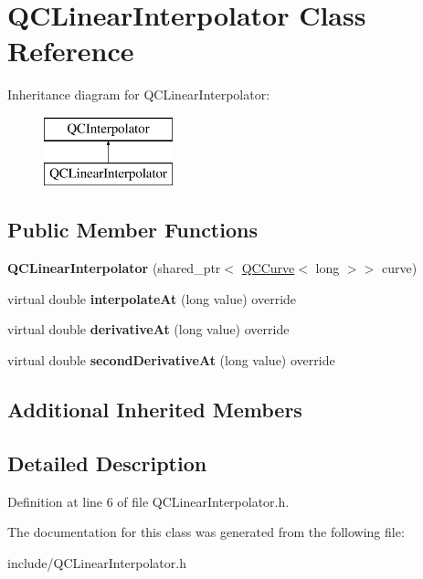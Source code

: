 \hypertarget{class_q_c_linear_interpolator}{\section{Q\+C\+Linear\+Interpolator Class Reference}
\label{class_q_c_linear_interpolator}
}
Inheritance diagram for Q\+C\+Linear\+Interpolator\+:\begin{figure}[H]
\begin{center}
\leavevmode
\includegraphics[height=2.000000cm]{class_q_c_linear_interpolator}
\end{center}
\end{figure}
\subsection*{Public Member Functions}
\begin{DoxyCompactItemize}
\item 
\hypertarget{class_q_c_linear_interpolator_afa1b20df27939e047743dda0a9c34ca1}{{\bfseries Q\+C\+Linear\+Interpolator} (shared\+\_\+ptr$<$ \hyperlink{class_q_c_curve}{Q\+C\+Curve}$<$ long $>$$>$ curve)}\label{class_q_c_linear_interpolator_afa1b20df27939e047743dda0a9c34ca1}

\item 
\hypertarget{class_q_c_linear_interpolator_a6eb1ce1cd8f7acba77bca9b095ada4e2}{virtual double {\bfseries interpolate\+At} (long value) override}\label{class_q_c_linear_interpolator_a6eb1ce1cd8f7acba77bca9b095ada4e2}

\item 
\hypertarget{class_q_c_linear_interpolator_a1935db5d0b62bbfc99cb9cf3200a2305}{virtual double {\bfseries derivative\+At} (long value) override}\label{class_q_c_linear_interpolator_a1935db5d0b62bbfc99cb9cf3200a2305}

\item 
\hypertarget{class_q_c_linear_interpolator_a222277421d69de76c97a6011e72b84b4}{virtual double {\bfseries second\+Derivative\+At} (long value) override}\label{class_q_c_linear_interpolator_a222277421d69de76c97a6011e72b84b4}

\end{DoxyCompactItemize}
\subsection*{Additional Inherited Members}


\subsection{Detailed Description}


Definition at line 6 of file Q\+C\+Linear\+Interpolator.\+h.



The documentation for this class was generated from the following file\+:\begin{DoxyCompactItemize}
\item 
include/Q\+C\+Linear\+Interpolator.\+h\end{DoxyCompactItemize}
